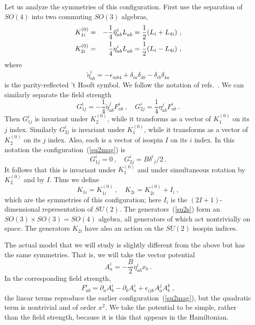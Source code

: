 \documentclass[a4paper,12pt]{article}
\begin{document}
Let us analyze the symmetries of this configuration.  First use the
separation of $SO(4)$ into two commuting $SO(3)$ algebras,
\begin{eqnarray}
K_{1i}^{(0)} &=& -\frac{1}{4}\tilde\eta^i_{ab}L^{\vphantom i}_{ab}
=\frac{1}{2}(L_i + L_{4i})
\ ,\nonumber\\
K_{2i}^{(0)} &=&\frac{1}{4}\eta^i_{ab}L^{\vphantom i}_{ab}
= \frac{1}{2}(L_i -  L_{4i})\ ,
\end{eqnarray}
where
\begin{equation}
\tilde\eta^i_{ab} = -\epsilon_{iab 4} + \delta_{ia} \delta_{4b}
- \delta_{ib} \delta_{4a}
\end{equation}
is the parity-reflected 't Hooft symbol.
We follow the notation of refs.~\cite{hz1,hz2}.  We can similarly separate
the field strength
\begin{equation}
G^i_{1j} = -\frac{1}{4}\tilde\eta^j_{ab}F^{ i}_{ab}\ ,
\quad G^i_{2j} = \frac{1}{4}\eta^j_{ab}F^{ i}_{ab}\ .
\end{equation}
Then $G^i_{1j}$ is invariant under $K_{2}^{(0)}$, while it transforms as a
vector of $K_{1}^{(0)}$ on its $j$ index.  Similarly $G^i_{2j}$ is
invariant under $K_{1}^{(0)}$, while it transforms as a vector of
$K_{2}^{(0)}$ on its $j$ index.  Also, each is a vector of isospin $I$
on its $i$ index.  In this notation the configuration~(\ref{su2mag}) is
\begin{equation}
G^i_{1j} = 0 \ , \quad G^i_{2j} = B \delta^i{}_j/2\ .
\end{equation}
It follows that this is invariant under $K_1^{(0)}$ and under
simultaneous rotation by $K_2^{(0)}$ and by $I$.  Thus we
define~\cite{hz1}
\begin{equation}
K_{1i} = K_{1i}^{(0)}\ , \quad
K_{2i} = K_{2i}^{(0)} + I_{i}\ , \label{su2s}
\end{equation}
which are the symmetries of this configuration; here $I_i$ is the
$(2I+1)$-dimensional representation of $SU(2)$.  The
generators~(\ref{su2s}) form an
$SO(3)
\times SO(3) = SO(4)$ algebra, all generators of which act nontrivially on
space.  The generators $K_{2i}$ have also an action on the $SU(2)$ isospin
indices.

The actual model that we will study is slightly different from the above
but has the same symmetries.  That is, we will take the vector potential
\begin{equation}
A^i_a = -\frac{B}{2} \eta^i_{ab} x_b\ . \label{su2vect}
\end{equation}
In the corresponding field strength, 
\begin{equation}
F^i_{ab} = \partial_a A^i_b - \partial_b A^i_a 
+ \epsilon_{ijk} A^j_a A^k_b
\ , 
\end{equation}
the linear terms reproduce the earlier configuration~(\ref{su2mag}), but
the quadratic term is nontrivial and of order $x^2$.  We take the
potential to be simple, rather than the field strength, because it is this
that appears in the Hamiltonian.
\end{document}
